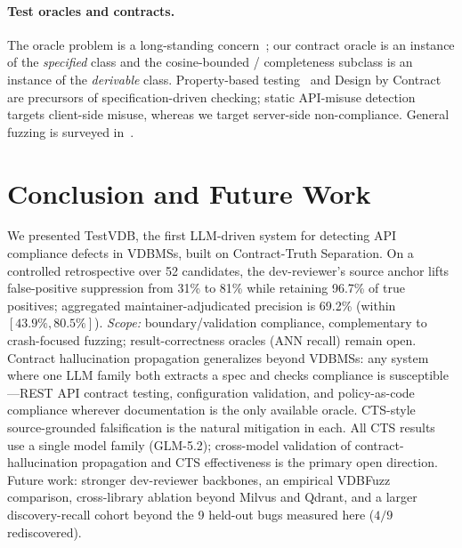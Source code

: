 \documentclass[sigconf]{acmart}
\begin{document}
\paragraph{Test oracles and contracts.} The oracle problem is a long-standing concern~\cite{barr15}; our contract oracle is an instance of the \emph{specified} class and the cosine-bounded / completeness subclass is an instance of the \emph{derivable} class. Property-based testing~\cite{claessen00} and Design by Contract~\cite{meyer92dbc} are precursors of specification-driven checking; static API-misuse detection~\cite{amann19} targets client-side misuse, whereas we target server-side non-compliance. General fuzzing is surveyed in~\cite{manes21}.

\section{Conclusion and Future Work}\label{sec:conc}
We presented TestVDB, the first LLM-driven system for detecting API compliance defects in VDBMSs, built on Contract-Truth Separation. On a controlled retrospective over 52 candidates, the dev-reviewer's source anchor lifts false-positive suppression from 31\% to 81\% while retaining 96.7\% of true positives; aggregated maintainer-adjudicated precision is 69.2\% (within $[43.9\%, 80.5\%]$). \emph{Scope:} boundary/validation compliance, complementary to crash-focused fuzzing; result-correctness oracles (ANN recall) remain open. Contract hallucination propagation generalizes beyond VDBMSs: any system where one LLM family both extracts a spec and checks compliance is susceptible---REST API contract testing, configuration validation, and policy-as-code compliance wherever documentation is the only available oracle. CTS-style source-grounded falsification is the natural mitigation in each. All CTS results use a single model family (GLM-5.2); cross-model validation of contract-hallucination propagation and CTS effectiveness is the primary open direction. Future work: stronger dev-reviewer backbones, an empirical VDBFuzz comparison, cross-library ablation beyond Milvus and Qdrant, and a larger discovery-recall cohort beyond the 9 held-out bugs measured here ($4/9$ rediscovered).



\end{document}
